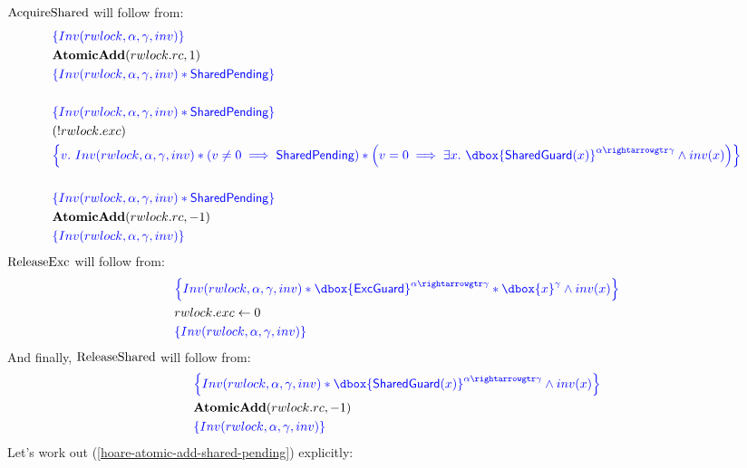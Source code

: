 \documentclass{article}
\newcommand\dboxed[1]{\dbox{\vphantom{t}\ensuremath{#1}}}
\newcommand{\pointsto}{\hookrightarrow}
\newcommand{\refines}{\rightarrowgtr}
\begin{document}
$\text{AcquireShared}$ will follow from:
\begin{align}
& \inlinehoare{ \Inv(\rwlock,\alpha,\gamma,\inv) } \nonumber \\
& \AtomicAdd(\rwlock.\rc, 1) \label{hoare-atomic-add-shared-pending} \\
& \inlinehoare{ \Inv(\rwlock,\alpha,\gamma,\inv) * \SharedPending } \nonumber\\
 \nonumber\\
& \inlinehoare{ \Inv(\rwlock,\alpha,\gamma,\inv) * \SharedPending }\nonumber\\
& (!\rwlock.\exc)\nonumber\\
& \inlinehoare{ v.~
    \Inv(\rwlock,\alpha,\gamma,\inv) * \left(v \ne 0 \implies \SharedPending\right)
        * \left(v = 0 \implies \exists x.~
          \dboxed{\SharedGuard(x)}^{\alpha \refines \gamma} \land \inv(x)\right)
   }\nonumber\\
   \nonumber\\
& \inlinehoare{ \Inv(\rwlock,\alpha,\gamma,\inv) * \SharedPending }\nonumber\\
& \AtomicAdd(\rwlock.\rc, -1)\nonumber\\
& \inlinehoare{ \Inv(\rwlock,\alpha,\gamma,\inv) }\nonumber
\end{align}
$\text{ReleaseExc}$ will follow from:
\begin{align*}
& \inlinehoare{ \Inv(\rwlock,\alpha,\gamma,\inv) * \dboxed{\ExcGuard}^{\alpha \refines \gamma} * \dboxed{x}^\gamma \land \inv(x) }\\
& \rwlock.\exc \langassign 0\\
& \inlinehoare{ \Inv(\rwlock,\alpha,\gamma,\inv) }
\end{align*}
And finally, $\text{ReleaseShared}$ will follow from:
\begin{align*}
& \inlinehoare{ \Inv(\rwlock,\alpha,\gamma,\inv) * \dboxed{\SharedGuard(x)}^{\alpha \refines \gamma} \land \inv(x) }\\
& \AtomicAdd(\rwlock.\rc, -1)\\
& \inlinehoare{ \Inv(\rwlock,\alpha,\gamma,\inv) }
\end{align*}
Let's work out (\ref{hoare-atomic-add-shared-pending}) explicitly:
\end{document}
